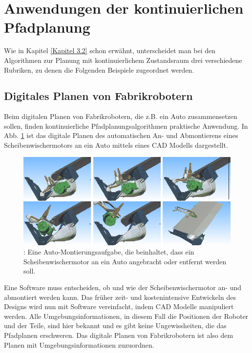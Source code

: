 \section{Anwendungen der kontinuierlichen Pfadplanung}
Wie in Kapitel \ref{Kapitel 3.2} schon erwähnt, unterscheidet man bei den Algorithmen zur Planung mit kontinuierlichem Zustandsraum drei verschiedene Rubriken, zu denen die Folgenden Beispiele zugeordnet werden.
\subsection{Digitales Planen von Fabrikrobotern}
Beim digitalen Planen von Fabrikrobotern, die z.B. ein Auto zusammensetzen sollen, finden kontinuierliche Pfadplanungsalgorithmen praktische Anwendung. In Abb. \ref{Abb. 4.2} ist das digitale Planen des automatischen An- und Abmontierens eines Scheibenwischermotors an ein Auto mittels eines CAD Modells dargestellt.
\begin{figure}
	\centering
	\includegraphics[width=0.7\linewidth]{images/img231}
	\caption{\cite[~S. 7, Abb. 1.3]{Lav06}: Eine Auto-Montierungsaufgabe, die beinhaltet, dass ein Scheibenwischermotor an ein Auto angebracht oder entfernt werden soll.}
	\label{Abb. 4.2}
\end{figure}

Eine Software muss entscheiden, ob und wie der Scheibenwischermotor an- und abmontiert werden kann. Das früher zeit- und kostenintensive Entwickeln des Designs wird nun mit Software vereinfacht, indem CAD Modelle manipuliert werden. Alle Umgebungsinformationen, in diesem Fall die Positionen der Roboter und der Teile, sind hier bekannt und es gibt keine Ungewissheiten, die das Pfadplanen erschweren\cite[~S. 6 ff]{Lav06}. Das digitale Planen von Fabrikrobotern ist also dem Planen mit Umgebungsinformationen zuzuordnen.


